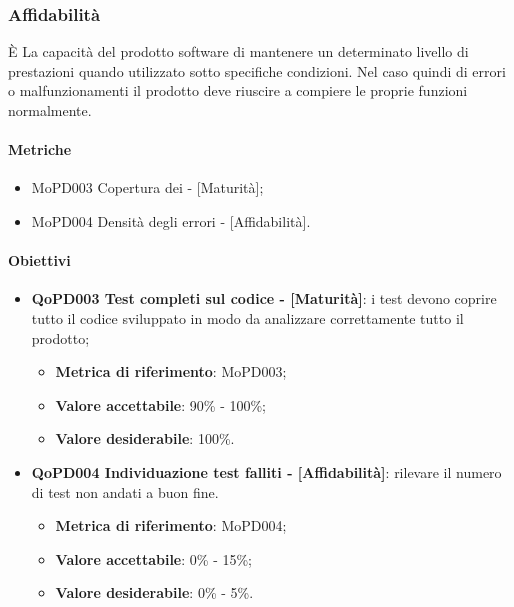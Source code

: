 \documentclass[../piano-di-qualifica.tex]{subfiles}
\begin{document}
\subsubsection{Affidabilità}%
\label{sub:affidabilita}
È La capacità del prodotto software di mantenere un determinato livello di prestazioni quando utilizzato sotto specifiche condizioni.
Nel caso quindi di errori o malfunzionamenti il prodotto deve riuscire a compiere le proprie funzioni normalmente.

\paragraph{Metriche}
\label{sub:metriche}
\begin{itemize}
    \item MoPD003 Copertura dei  - [Maturità];
    \item MoPD004 Densità degli errori - [Affidabilità].
\end{itemize}

\paragraph{Obiettivi}
\label{sub:obiettivi}
\begin{itemize}
    \item \textbf{QoPD003 Test completi sul codice - [Maturità]}: i test devono coprire tutto il codice sviluppato in modo da analizzare correttamente tutto il prodotto;
        \begin{itemize}
            \item \textbf{Metrica di riferimento}: MoPD003;
            \item \textbf{Valore accettabile}: 90\% - 100\%;
            \item \textbf{Valore desiderabile}: 100\%.
        \end{itemize}
    \item \textbf{QoPD004 Individuazione test falliti - [Affidabilità]}: rilevare il numero di test non andati a buon fine.
        \begin{itemize}
            \item \textbf{Metrica di riferimento}: MoPD004;
            \item \textbf{Valore accettabile}: 0\% - 15\%;
            \item \textbf{Valore desiderabile}: 0\% - 5\%.
        \end{itemize}
\end{itemize}
\end{document}
